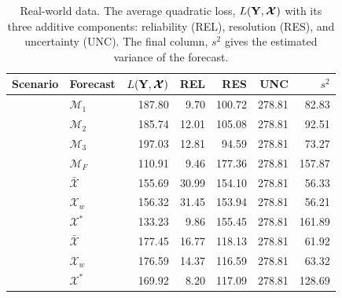 \documentclass[11pt]{article}
\theoremstyle{definition}
\theoremstyle{definition}
\def\Y{{\bf Y}}
\begin{document}
\begin{table}[h!]
\centering
\caption{Real-world data. The average quadratic loss, $L(\Y,\boldsymbol{\mathcal{X}} )$ with its three additive components: reliability (REL), resolution (RES), and uncertainty (UNC). The final column, $s^2$ gives the estimated variance of the forecast. } 
\begin{tabular}{llrrrrr}
  \hline \hline
Scenario &  Forecast & $L(\Y,\boldsymbol{\mathcal{X}} )$ & REL & RES & UNC & $s^2$\\ 
  \hline
 &  $\mathcal{M}_1$ & 187.80 & 9.70 & 100.72 & 278.81 & 82.83 \\ 
& $\mathcal{M}_2$  & 185.74 & 12.01 & 105.08 & 278.81 & 92.51 \\ 
  & $\mathcal{M}_3$ & 197.03 & 12.81 & 94.59 & 278.81 & 73.27 \\ 
&$\mathcal{M}_F$  & 110.91 & 9.46 & 177.36 & 278.81 & 157.87 \\ \rule{0pt}{2.9ex} 
\multirow{3}{*}{No Overlap} &  $\bar{\mathcal{X}}$ & 155.69 & 30.99 & 154.10 & 278.81 & 56.33 \\ 
 & $\mathcal{X}_w$ & 156.32 & 31.45 & 153.94 & 278.81 & 56.21 \\ 
  &$\mathcal{X}^*$ & 133.23 & 9.86 & 155.45 & 278.81 & 161.89 \\ \rule{0pt}{2.9ex} 
 \multirow{3}{*}{High Overlap}  & $\bar{\mathcal{X}}$ & 177.45 & 16.77 & 118.13 & 278.81 & 61.92 \\ 
  & $\mathcal{X}_w$ & 176.59 & 14.37 & 116.59 & 278.81 & 63.32 \\ 
 & $\mathcal{X}^*$ & 169.92 & 8.20 & 117.09 & 278.81 & 128.69 \\ 
\hline
\end{tabular}
\label{NoTbl}
\end{table}
\end{document}
